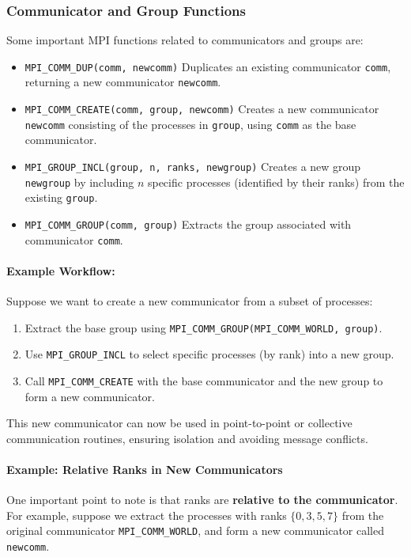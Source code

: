 \documentclass[12pt]{book}
\begin{document}
\subsubsection{Communicator and Group Functions}
Some important MPI functions related to communicators and groups are:
\begin{itemize}
    \item \texttt{MPI\_COMM\_DUP(comm, newcomm)}  
    Duplicates an existing communicator \texttt{comm}, returning a new communicator \texttt{newcomm}.
    
    \item \texttt{MPI\_COMM\_CREATE(comm, group, newcomm)}  
    Creates a new communicator \texttt{newcomm} consisting of the processes in \texttt{group}, using \texttt{comm} as the base communicator.
    
    \item \texttt{MPI\_GROUP\_INCL(group, n, ranks, newgroup)}  
    Creates a new group \texttt{newgroup} by including $n$ specific processes (identified by their ranks) from the existing \texttt{group}.
    
    \item \texttt{MPI\_COMM\_GROUP(comm, group)}  
    Extracts the group associated with communicator \texttt{comm}.
\end{itemize}

\paragraph{Example Workflow:}  
Suppose we want to create a new communicator from a subset of processes:
\begin{enumerate}
    \item Extract the base group using \texttt{MPI\_COMM\_GROUP(MPI\_COMM\_WORLD, group)}.
    \item Use \texttt{MPI\_GROUP\_INCL} to select specific processes (by rank) into a new group.
    \item Call \texttt{MPI\_COMM\_CREATE} with the base communicator and the new group to form a new communicator.
\end{enumerate}

This new communicator can now be used in point-to-point or collective communication routines, ensuring isolation and avoiding message conflicts.

\paragraph{Example: Relative Ranks in New Communicators}  
One important point to note is that ranks are \textbf{relative to the communicator}.  
For example, suppose we extract the processes with ranks $\{0,3,5,7\}$ from the original communicator \texttt{MPI\_COMM\_WORLD}, and form a new communicator called \texttt{newcomm}.  
\end{document}
